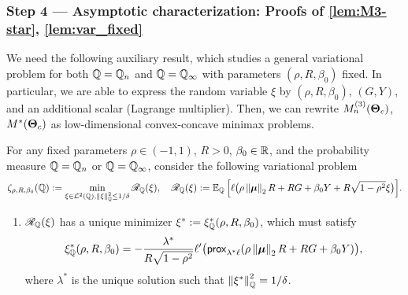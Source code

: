 \subsubsection{Step 4 --- Asymptotic characterization: Proofs of \cref{lem:M3-star}, \ref{lem:var_fixed}}
\label{subsubsec:under_step4}

We need the following auxiliary result, which studies a general variational problem for both $\mathbb{Q} = \mathbb{Q}_n$ and $\mathbb{Q} = \mathbb{Q}_\infty$ with parameters $(\rho, R, \beta_0)$ fixed. In particular, we are able to express the random variable $\xi$ by $(\rho, R, \beta_0)$, $(G, Y)$, and an additional scalar (Lagrange multiplier). Then, we can rewrite $M_n^{(3)}(\text{\boldmath $\Theta$}_{c})$, $M^{*}(\text{\boldmath $\Theta$}_{c})$ as low-dimensional convex-concave minimax problems.

\begin{lem}\label{lem:var_fixed}
    For any fixed parameters $\rho \in (-1, 1)$, $R > 0$, $\beta_0 \in \mathbb{R}$, and the probability measure $\mathbb{Q} = \mathbb{Q}_n$ or $\mathbb{Q} = \mathbb{Q}_\infty$, consider the following variational problem
    \begin{equation}
    \label{eq:ERM_var_fix}
        \zeta_{\rho, R, \beta_0}(\mathbb{Q}) :=
        \min_{\xi \in \mathcal{L}^2(\mathbb{Q}), \left\|{\xi}\right\|_{\mathbb{Q}}^2 \le 1/\delta} \mathscr{R}_{\mathbb{Q}}(\xi),
        \quad
        \mathscr{R}_{\mathbb{Q}}(\xi) := \mathbb{E}_{\mathbb{Q}} \left[ \ell \bigl( \rho\left\|{{\boldsymbol{\mu}}}\right\|_2 R + RG + \beta_0 Y + R\sqrt{1 - \rho^2} \xi \bigr) \right] \! .
    \end{equation}
    \begin{enumerate}[label=(\alph*)]
        \item \label{lem:var_fixed(a)}
        $\mathscr{R}_{\mathbb{Q}}(\xi)$ has a unique minimizer $\xi^* := \xi^*_{\mathbb{Q}}(\rho, R, \beta_0)$, which must satisfy
        \begin{equation}\label{eq:xi_star}
            \xi^*_{\mathbb{Q}}(\rho, R, \beta_0) = - \frac{\lambda^*}{R \sqrt{1 - \rho^2}}\ell'\bigl(\mathsf{prox}_{ \lambda^* \ell}( \rho\left\|{{\boldsymbol{\mu}}}\right\|_2 R + RG + \beta_0 Y )\bigr),
        \end{equation}
        where $\lambda^*$ is the unique solution such that $\left\|{\xi^*}\right\|_{\mathbb{Q}}^2 = 1/\delta$.

\end{enumerate}
\end{lem}
